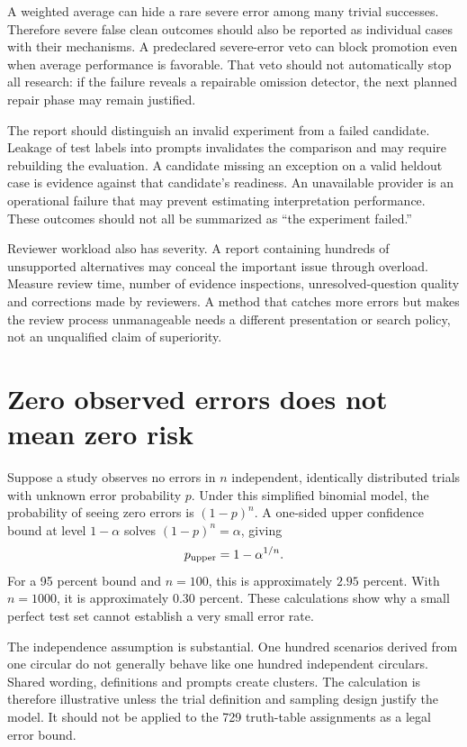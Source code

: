 \documentclass[12pt,a4paper,oneside,openany]{book}
\begin{document}
A weighted average can hide a rare severe error among many trivial successes.
Therefore severe false clean outcomes should also be reported as individual cases
with their mechanisms. A predeclared severe-error veto can block promotion even
when average performance is favorable. That veto should not automatically stop
all research: if the failure reveals a repairable omission detector, the next
planned repair phase may remain justified.

The report should distinguish an invalid experiment from a failed candidate.
Leakage of test labels into prompts invalidates the comparison and may require
rebuilding the evaluation. A candidate missing an exception on a valid heldout
case is evidence against that candidate's readiness. An unavailable provider is
an operational failure that may prevent estimating interpretation performance.
These outcomes should not all be summarized as ``the experiment failed.''

Reviewer workload also has severity. A report containing hundreds of unsupported
alternatives may conceal the important issue through overload. Measure review
time, number of evidence inspections, unresolved-question quality and corrections
made by reviewers. A method that catches more errors but makes the review process
unmanageable needs a different presentation or search policy, not an unqualified
claim of superiority.

\section{Zero observed errors does not mean zero risk}

Suppose a study observes no errors in $n$ independent, identically distributed
trials with unknown error probability $p$. Under this simplified binomial model,
the probability of seeing zero errors is $(1-p)^n$. A one-sided upper confidence
bound at level $1-\alpha$ solves $(1-p)^n=\alpha$, giving
\begin{equation}
 p_{\rm upper}=1-\alpha^{1/n}.
 \label{eq:zero-errors}
\end{equation}
For a 95 percent bound and $n=100$, this is approximately $2.95$ percent. With
$n=1000$, it is approximately $0.30$ percent. These calculations show why a small
perfect test set cannot establish a very small error rate.

The independence assumption is substantial. One hundred scenarios derived from
one circular do not generally behave like one hundred independent circulars.
Shared wording, definitions and prompts create clusters. The calculation is
therefore illustrative unless the trial definition and sampling design justify
the model. It should not be applied to the 729 truth-table assignments as a legal
error bound.
\end{document}
